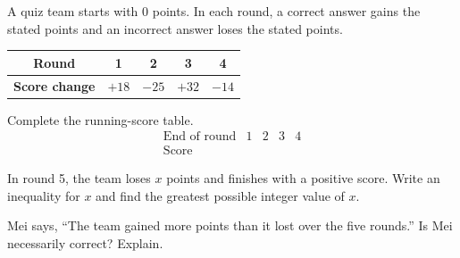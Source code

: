  A quiz team starts with $0$ points. In each round, a correct answer gains the stated points and an incorrect answer loses the stated points.
\begin{center}
\begin{tabular}{|c|c|c|c|c|}
\hline
\textbf{Round} & 1 & 2 & 3 & 4\\ \hline
\textbf{Score change} & $+18$ & $-25$ & $+32$ & $-14$\\ \hline
\end{tabular}
\end{center}
\begin{subparts}
  \item Complete the running-score table.
  \[
  \begin{array}{c|cccc}
  \text{End of round} & 1&2&3&4\\ \hline
  \text{Score}&&&&
  \end{array}
  \]
  \item In round 5, the team loses $x$ points and finishes with a positive score. Write an inequality for $x$ and find the greatest possible integer value of $x$.
  \item Mei says, ``The team gained more points than it lost over the five rounds.'' Is Mei necessarily correct? Explain.
\end{subparts}

